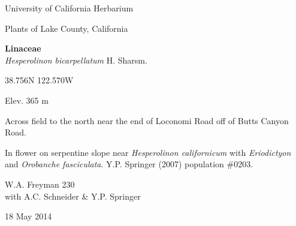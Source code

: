 \documentclass[letterpaper,10pt]{article}
\begin{document}
\begin{minipage}[t]{0.40\textwidth}

\begin{center}
University of California Herbarium \\
\begin{large}
Plants of Lake County, California \\
\end{large}
\vspace{\baselineskip}
\textbf{Linaceae} \\
\textit{Hesperolinon bicarpellatum} H. Sharsm.\\
\end{center}

\begin{footnotesize}

\begin{multicols}{2}
38.756\textdegree N 122.570\textdegree W
\columnbreak
\begin{flushright}
Elev. 365 m
\end{flushright}
\end{multicols}

Across field to the north near the end of Loconomi Road off of Butts Canyon Road.
\vspace{\baselineskip}

In flower on serpentine slope near \textit{Hesperolinon californicum} with \textit{Eriodictyon} and \textit{Orobanche fasciculata}. Y.P. Springer (2007) population \#0203.

\begin{multicols}{2}
W.A. Freyman 230 \\
with A.C. Schneider \& Y.P. Springer
\columnbreak
\begin{flushright}
18 May 2014
\end{flushright}
\end{multicols}

\end{footnotesize}

\end{minipage}
%
\hspace{2cm}
%
\end{document}
